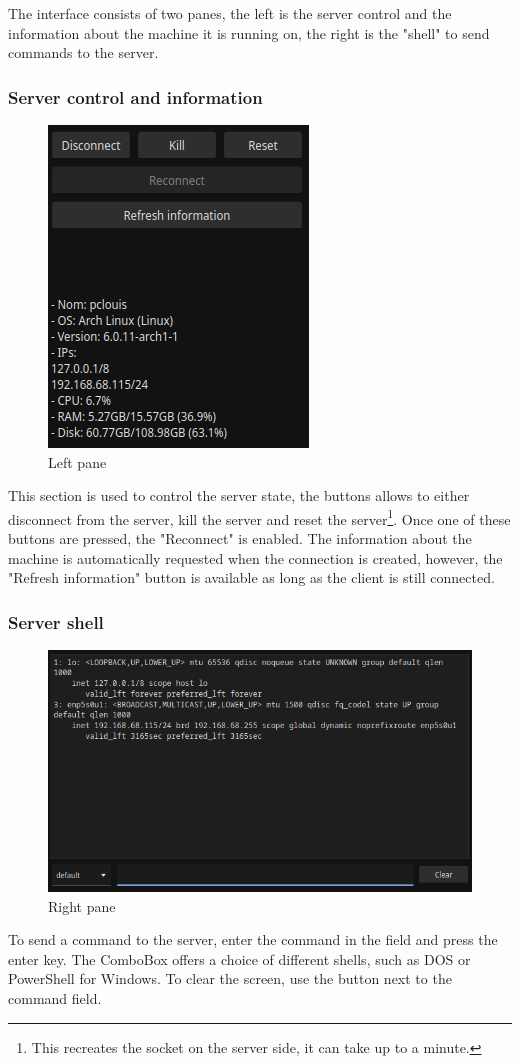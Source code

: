 \documentclass{article}
\begin{document}
The interface consists of two panes, the left is the server control and the
information about the machine it is running on, the right is the "shell" to send
commands to the server.

\subsubsection{Server control and information}
\begin{figure}[H]
    \begin{center}
        \includegraphics[width=0.25\linewidth]{fig/left.png}
    \end{center}
    \caption{Left pane}
    \label{client:left}
\end{figure}
This section is used to control the server state, the buttons allows to either
disconnect from the server, kill the server and reset the server\footnote{This
recreates the socket on the server side, it can take up to a minute.}. Once one
of these buttons are pressed, the "Reconnect" is enabled. The information about
the machine is automatically requested when the connection is created, however,
the "Refresh information" button is available as long as the client is still
connected.

\subsubsection{Server shell}
\begin{figure}[H]
    \begin{center}
        \includegraphics[width=0.7\linewidth]{fig/command.png}
    \end{center}
    \caption{Right pane}
    \label{client:right}
\end{figure}
To send a command to the server, enter the command in the field and press the
enter key. The ComboBox offers a choice of different shells, such as DOS or
PowerShell for Windows. To clear the screen, use the button next to the command
field.
\end{document}
